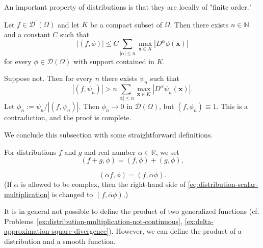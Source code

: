 An important property of distributions is that they are locally of "finite order."

\begin{Lemma}
\label{lem:distribution-local-finite-order}
Let $f\in\mathcal{D}^{\prime}(\Omega)$ and let $K$ be a compact subset of $\Omega$. Then there exists $n\in\mathbb{N}$ and a constant $C$ such that
\begin{equation}\label{eq:distribution-local-finite-order-bound}
|(f,\phi)|\leq C\sum_{|\alpha|\leq n}\max_{\bm{x}\in K}|D^\alpha\phi(\bm{x})|
\end{equation}
for every $\phi\in\mathcal{D}(\Omega)$ with support contained in $K$.
\end{Lemma}

\begin{Proof}
Suppose not. Then for every $n$ there exists $\psi_n$ such that\[|(f,\psi_n)|>n\sum_{|\alpha|\leq n}\max_{\bm{x}\in K}|D^\alpha\psi_n(\bm{x})|.\]Let $\phi_n:=\psi_n/|(f,\psi_n)|$. Then $\phi_n\to0$ in $\mathcal{D}(\Omega)$, but $(f,\phi_n)\equiv1$. This is a contradiction, and the proof is complete.
\end{Proof}

We conclude this subsection with some straightforward definitions.

\begin{Definition}
\label{def:distribution-linear-operations}
For distributions $f$ and $g$ and real number $\alpha\in\mathbb{R}$, we set
\begin{equation}\label{eq:distribution-addition}
(f+g,\phi)=(f,\phi)+(g,\phi),
\end{equation}

\begin{equation}\label{eq:distribution-scalar-multiplication}
(\alpha f,\phi)=(f,\alpha\phi).
\end{equation}
(If $\alpha$ is allowed to be complex, then the right-hand side of \eqref{eq:distribution-scalar-multiplication} is changed to $(f,\overline\alpha\phi)$.)
\end{Definition}

\begin{Remark}
\label{rem:distribution-products}
It is in general not possible to define the product of two generalized functions (cf. Problems~\ref{ex:distribution-multiplication-not-continuous}, \ref{ex:delta-approximation-square-divergence}). However, we can define the product of a distribution and a smooth function.
\end{Remark}

